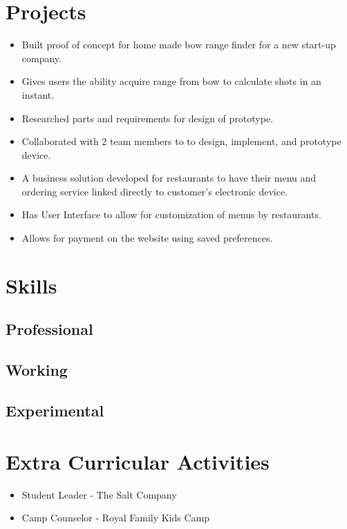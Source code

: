 \documentclass[10pt,a4paper,sans]{moderncv}
\begin{document}
\section{Projects}
{\begin{itemize}
    \item Built proof of concept for home made bow range finder for a new start-up company.
    \item Gives users the ability acquire range from bow to calculate shots in an instant.
    \item Researched parts and requirements for design of prototype.
    \item Collaborated with 2 team members to to design, implement, and prototype device.
\end{itemize}}
{\begin{itemize}
    \item A business solution developed for restaurants to have their menu and ordering service linked directly to customer's electronic device.
    \item Has User Interface to allow for customization of menus by restaurants.
    \item Allows for payment on the website using saved preferences.
\end{itemize}}

\section{Skills}
\subsection{Professional}
\subsection{Working}
\subsection{Experimental}

\section{Extra Curricular Activities}
\begin{itemize}
\item Student Leader - The Salt Company
\item Camp Counselor - Royal Family Kids Camp

\end{itemize}
\nocite{*}


\clearpage
\end{document}
